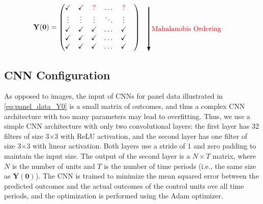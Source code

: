 \begin{align}
        \mathbf{Y(0)}&=\begin{pmatrix}
        \tick  & \tick & {\color{red} ?}   & \dots & {\color{red} ?}  &\\
        \vdots   &  \vdots & \vdots &\ddots &\vdots& \\
        \tick & \tick & \tick  & \dots & \tick& \\
        \tick  & \tick & \tick   & \dots & \tick & \\
        \tick & \tick & \tick   & \dots & \tick &
        \end{pmatrix} 
        \quad
        \begin{tikzpicture}[baseline={(current bounding box.center)}]
            \draw[very thick,->,>=latex] (0,1.2) -- (0,-1) node[midway,right] {\textcolor{red}{Mahalanobis Ordering}};
        \end{tikzpicture}
\end{align}


\subsection{CNN Configuration}
As opposed to images, the input of CNNs for panel data illustrated in \eqref{eq:panel_data_Y0} is a small matrix of outcomes, 
and thus a complex CNN architecture with too many parameters may lead to overfitting.
Thus, we use a simple CNN architecture with only two convolutional layers: the first layer has 32 filters of size 3$\times$3 with ReLU activation,
and the second layer has one filter of size 3$\times$3 with linear activation.
Both layers use a stride of 1 and zero padding to maintain the input size.
The output of the second layer is a $N \times T$ matrix, where $N$ is the number of units and $T$ is the number of time periods (i.e., the same size as $\mathbf{Y(0)}$).
The CNN is trained to minimize the mean squared error between the predicted outcomes and the actual outcomes of the control units ove all time periods,
and the optimization is performed using the Adam optimizer.